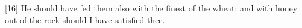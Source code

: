 [16] \textcolor[cmyk]{0.99998,1,0,0}{He should have fed them also with the finest of the wheat: and with honey out of the rock should I have satisfied thee.} %

